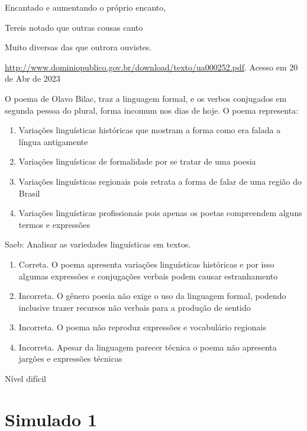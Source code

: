 {{\begin{itemize}
\begin{itemize}
Encantado e aumentando o próprio encanto,

Tereis notado que outras cousas canto

Muito diversas das que outrora ouvistes.

\href{http://www.dominiopublico.gov.br/download/texto/ua000252.pdf}{\uline{http://www.dominiopublico.gov.br/download/texto/ua000252.pdf}}.
Acesso em 20 de Abr de 2023

O poema de Olavo Bilac, traz a linguagem formal, e os verbos conjugados
em segunda pessoa do plural, forma incomum nos dias de hoje. O poema
representa:

\begin{enumerate}
\def\labelenumi{\alph{enumi})}
\item
  Variações linguísticas históricas que mostram a forma como era falada
  a língua antigamente
\item
  Variações linguísticas de formalidade por se tratar de uma poesia
\item
  Variações linguísticas regionais pois retrata a forma de falar de uma
  região do Brasil
\item
  Variações linguísticas profissionais pois apenas os poetas compreendem
  alguns termos e expressões
\end{enumerate}

Saeb: Analisar as variedades linguísticas em textos.

\begin{enumerate}
\def\labelenumi{\arabic{enumi}.}
\item
  Correta. O poema apresenta variações linguísticas históricas e por
  isso algumas expressões e conjugações verbais podem causar
  estranhamento
\item
  Incorreta. O gênero poesia não exige o uso da linguagem formal,
  podendo inclusive trazer recursos não verbais para a produção de
  sentido
\item
  Incorreta. O poema não reproduz expressões e vocabulário regionais
\item
  Incorreta. Apesar da linguagem parecer técnica o poema não apresenta
  jargões e expressões técnicas
\end{enumerate}

Nível difícil

\chapter{Simulado 1}


\end{itemize}
\end{itemize}}}
